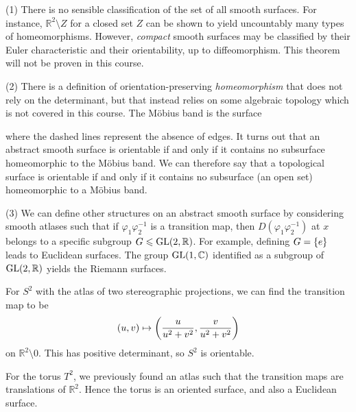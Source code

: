 \documentclass[a4paper,11pt]{article}
\begin{document}
\begin{remark}
	(1) There is no sensible classification of the set of all smooth surfaces.
	For instance, \( \mathbb R^2 \setminus Z \) for a closed set \( Z \) can be shown to yield uncountably many types of homeomorphisms.
	However, \textit{compact} smooth surfaces may be classified by their Euler characteristic and their orientability, up to diffeomorphism.
	This theorem will not be proven in this course.

	(2) There is a definition of orientation-preserving \textit{homeomorphism} that does not rely on the determinant, but that instead relies on some algebraic topology which is not covered in this course.
	The M\"obius band is the surface
	\begin{center}
	\end{center}
	where the dashed lines represent the absence of edges.
	It turns out that an abstract smooth surface is orientable if and only if it contains no subsurface homeomorphic to the M\"obius band.
	We can therefore say that a topological surface is orientable if and only if it contains no subsurface (an open set) homeomorphic to a M\"obius band.

	(3) We can define other structures on an abstract smooth surface by considering smooth atlases such that if \( \varphi_1 \varphi_2^{-1} \) is a transition map, then \( D (\varphi_1 \varphi_2^{-1}) \) at \( x \) belongs to a specific subgroup \( G \leqslant \mathrm{GL}(2, \mathbb R) \).
	For example, defining \( G = \qty{e} \) leads to Euclidean surfaces.
	The group \( \mathrm{GL}(1, \mathbb C) \) identified as a subgroup of \( \mathrm{GL}(2, \mathbb R) \) yields the Riemann surfaces.
\end{remark}

\begin{example}
	For \( S^2 \) with the atlas of two stereographic projections, we can find the transition map to be
	\[
		(u,v) \mapsto \qty(\frac{u}{u^2 + v^2}, \frac{v}{u^2 + v^2})
	\]
	on \( \mathbb R^2 \setminus \qty{0} \).
	This has positive determinant, so \( S^2 \) is orientable.

	For the torus \( T^2 \), we previously found an atlas such that the transition maps are translations of \( \mathbb R^2 \).
	Hence the torus is an oriented surface, and also a Euclidean surface.
\end{example}
\end{document}
